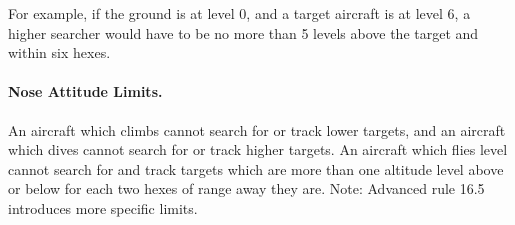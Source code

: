 For example, if the ground is at level 0, and a target aircraft is at level 6, a higher searcher would have to be no more than 5 levels above the target and within six hexes.


\paragraph{Nose Attitude Limits.} An aircraft which climbs cannot search for or track lower targets, and an aircraft which dives cannot search for or track higher targets. An aircraft which flies level cannot search for and track targets which are more than one altitude level above or below for each two hexes of range away they are. Note: Advanced rule 16.5 introduces more specific limits.

